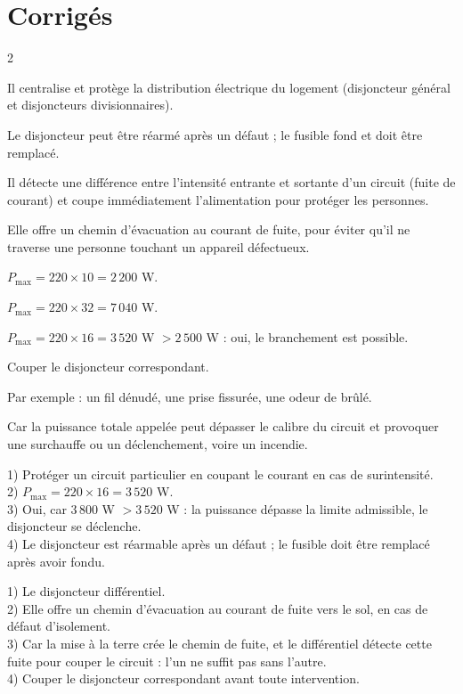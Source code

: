 \section{Corrigés}
\begin{multicols}{2}

Il centralise et protège la distribution électrique du logement (disjoncteur général et
disjoncteurs divisionnaires).

Le disjoncteur peut être réarmé après un défaut ; le fusible fond et doit être
remplacé.

Il détecte une différence entre l'intensité entrante et sortante d'un circuit (fuite de
courant) et coupe immédiatement l'alimentation pour protéger les personnes.

Elle offre un chemin d'évacuation au courant de fuite, pour éviter qu'il ne traverse une
personne touchant un appareil défectueux.

$P_{\max}=220\times10=2\,200$ W.

$P_{\max}=220\times32=7\,040$ W.

$P_{\max}=220\times16=3\,520$ W $>2\,500$ W : oui, le branchement est possible.

Couper le disjoncteur correspondant.

Par exemple : un fil dénudé, une prise fissurée, une odeur de brûlé.

Car la puissance totale appelée peut dépasser le calibre du circuit et provoquer une
surchauffe ou un déclenchement, voire un incendie.

1) Protéger un circuit particulier en coupant le courant en cas de surintensité.\\
2) $P_{\max}=220\times16=3\,520$ W.\\
3) Oui, car $3\,800$ W $>3\,520$ W : la puissance dépasse la limite admissible, le
disjoncteur se déclenche.\\
4) Le disjoncteur est réarmable après un défaut ; le fusible doit être remplacé après
avoir fondu.

1) Le disjoncteur différentiel.\\
2) Elle offre un chemin d'évacuation au courant de fuite vers le sol, en cas de défaut
d'isolement.\\
3) Car la mise à la terre crée le chemin de fuite, et le différentiel détecte cette fuite
pour couper le circuit : l'un ne suffit pas sans l'autre.\\
4) Couper le disjoncteur correspondant avant toute intervention.


\end{multicols}
